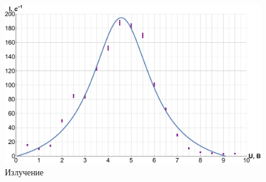 \documentclass[12pt]{kiarticle}
\begin{document}
	 	\begin{figure}[h]
	 	\label{graf_5}
	 	\includegraphics[scale=0.47]{gr5.pdf}
	 	\caption{Излучение}
	 \end{figure}
 
\end{document}
